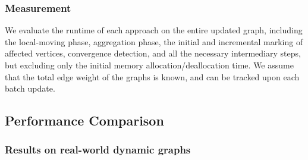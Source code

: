 \subsubsection{Measurement}
\label{sec:measurement}

We evaluate the runtime of each approach on the entire updated graph, including the local-moving phase, aggregation phase, the initial and incremental marking of affected vertices, convergence detection, and all the necessary intermediary steps, but excluding only the initial memory allocation/deallocation time. We assume that the total edge weight of the graphs is known, and can be tracked upon each batch update.






\ignore{\label{sec:evaluation--optimality}}



\ignore{}




\subsection{Performance Comparison}
\label{sec:performance-comparison}

\subsubsection{Results on real-world dynamic graphs}

